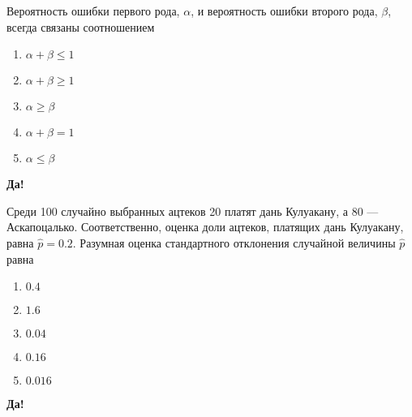 \documentclass[t]{beamer}
\begin{document}
 \begin{frame} \label{58-Yes} 
\begin{block}{58} 

Вероятность ошибки первого рода, $\alpha$, и вероятность ошибки второго рода, $\beta$, всегда связаны соотношением


 \end{block} 
\begin{enumerate} 
\item[] \hyperlink{58-No}{\beamergotobutton{} $\alpha+\beta \leq 1$}
\item[] \hyperlink{58-No}{\beamergotobutton{} $\alpha+\beta \geq 1$}
\item[] \hyperlink{58-No}{\beamergotobutton{} $\alpha\geq \beta $}
\item[] \hyperlink{58-No}{\beamergotobutton{} $\alpha+\beta=1$}
\item[] \hyperlink{58-No}{\beamergotobutton{} $\alpha\leq \beta $}
\end{enumerate} 

 \textbf{Да!} 
 \hyperlink{59}{}\end{frame} 


 \begin{frame} \label{59-Yes} 
\begin{block}{59} 

Среди 100 случайно выбранных ацтеков 20 платят дань Кулуакану, а 80 — Аскапоцалько. Соответственно, оценка доли ацтеков, платящих дань Кулуакану, равна $\hat{p}=0.2$. Разумная оценка стандартного отклонения случайной величины $\hat{p}$ равна
 


 \end{block} 
\begin{enumerate} 
\item[] \hyperlink{59-No}{\beamergotobutton{} $0.4$}
\item[] \hyperlink{59-No}{\beamergotobutton{} $1.6$}
\item[] \hyperlink{59-Yes}{\beamergotobutton{} $0.04$}
\item[] \hyperlink{59-No}{\beamergotobutton{} $0.16$}
\item[] \hyperlink{59-No}{\beamergotobutton{} $0.016$}
\end{enumerate} 

 \textbf{Да!} 
 \hyperlink{60}{}\end{frame} 
\end{document}
